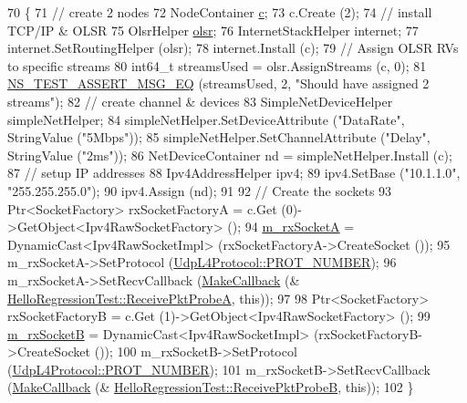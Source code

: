 \begin{DoxyCode}
70 \{
71   \textcolor{comment}{// create 2 nodes}
72   NodeContainer \hyperlink{lte_2model_2fading-traces_2fading__trace__generator_8m_ae0323a9039add2978bf5b49550572c7c}{c};
73   c.Create (2);
74   \textcolor{comment}{// install TCP/IP & OLSR}
75   OlsrHelper \hyperlink{namespaceolsr}{olsr};
76   InternetStackHelper internet;
77   internet.SetRoutingHelper (olsr);
78   internet.Install (c);
79   \textcolor{comment}{// Assign OLSR RVs to specific streams}
80   int64\_t streamsUsed = olsr.AssignStreams (c, 0);
81   \hyperlink{group__testing_ga2a9d78cffb3db8e867c35fff0b698cf5}{NS\_TEST\_ASSERT\_MSG\_EQ} (streamsUsed, 2, \textcolor{stringliteral}{"Should have assigned 2 streams"});
82   \textcolor{comment}{// create channel & devices}
83   SimpleNetDeviceHelper simpleNetHelper;
84   simpleNetHelper.SetDeviceAttribute (\textcolor{stringliteral}{"DataRate"}, StringValue (\textcolor{stringliteral}{"5Mbps"}));
85   simpleNetHelper.SetChannelAttribute (\textcolor{stringliteral}{"Delay"}, StringValue (\textcolor{stringliteral}{"2ms"}));
86   NetDeviceContainer nd = simpleNetHelper.Install (c);
87   \textcolor{comment}{// setup IP addresses}
88   Ipv4AddressHelper ipv4;
89   ipv4.SetBase (\textcolor{stringliteral}{"10.1.1.0"}, \textcolor{stringliteral}{"255.255.255.0"});
90   ipv4.Assign (nd);
91 
92   \textcolor{comment}{// Create the sockets}
93   Ptr<SocketFactory> rxSocketFactoryA = c.Get (0)->GetObject<Ipv4RawSocketFactory> ();
94   \hyperlink{classns3_1_1olsr_1_1HelloRegressionTest_a09824a508053ac7482c72babc4976558}{m\_rxSocketA} = DynamicCast<Ipv4RawSocketImpl> (rxSocketFactoryA->CreateSocket ());
95   m\_rxSocketA->SetProtocol (\hyperlink{classns3_1_1UdpL4Protocol_ad370801b3d1a166e831020a777c41047}{UdpL4Protocol::PROT\_NUMBER});
96   m\_rxSocketA->SetRecvCallback (\hyperlink{group__makecallbackmemptr_ga9376283685aa99d204048d6a4b7610a4}{MakeCallback} (&
      \hyperlink{classns3_1_1olsr_1_1HelloRegressionTest_a054ed2a66a9d8a840b9e0950808035d5}{HelloRegressionTest::ReceivePktProbeA}, \textcolor{keyword}{this}));
97 
98   Ptr<SocketFactory> rxSocketFactoryB = c.Get (1)->GetObject<Ipv4RawSocketFactory> ();
99   \hyperlink{classns3_1_1olsr_1_1HelloRegressionTest_a36afc1d537401f41ec4a5d899584cdcb}{m\_rxSocketB} = DynamicCast<Ipv4RawSocketImpl> (rxSocketFactoryB->CreateSocket ());
100   m\_rxSocketB->SetProtocol (\hyperlink{classns3_1_1UdpL4Protocol_ad370801b3d1a166e831020a777c41047}{UdpL4Protocol::PROT\_NUMBER});
101   m\_rxSocketB->SetRecvCallback (\hyperlink{group__makecallbackmemptr_ga9376283685aa99d204048d6a4b7610a4}{MakeCallback} (&
      \hyperlink{classns3_1_1olsr_1_1HelloRegressionTest_accc7c74bb7e64c7f15788aa23ba6e52a}{HelloRegressionTest::ReceivePktProbeB}, \textcolor{keyword}{this}));
102 \}
\end{DoxyCode}


